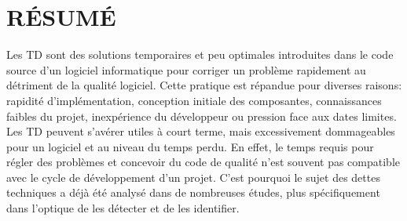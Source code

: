 %
%


\chapter*{RÉSUMÉ}\thispagestyle{headings}

\setlength{\parindent}{5ex} Les \ac{TD} sont des solutions temporaires et peu optimales introduites dans le code source d'un logiciel informatique pour corriger un probl\`{e}me rapidement au d\'{e}triment de la qualit\'{e} logiciel. Cette pratique est r\'{e}pandue pour diverses raisons: rapidit\'{e} d'impl\'{e}mentation, conception initiale des composantes, connaissances faibles du projet, inexp\'{e}rience du d\'{e}veloppeur ou pression face aux dates limites. Les \ac{TD} peuvent s'av\'{e}rer utiles \`{a} court terme, mais excessivement dommageables pour un logiciel et au niveau du temps perdu. En effet, le temps requis pour r\'{e}gler des probl\`{e}mes et concevoir du code de qualit\'{e} n'est souvent pas compatible avec le cycle de d\'{e}veloppement d'un projet. C'est pourquoi le sujet des dettes techniques a d\'{e}j\`{a} \'{e}t\'{e} analys\'{e} dans de nombreuses \'{e}tudes, plus sp\'{e}cifiquement dans l'optique de les d\'{e}tecter et de les identifier. \par

